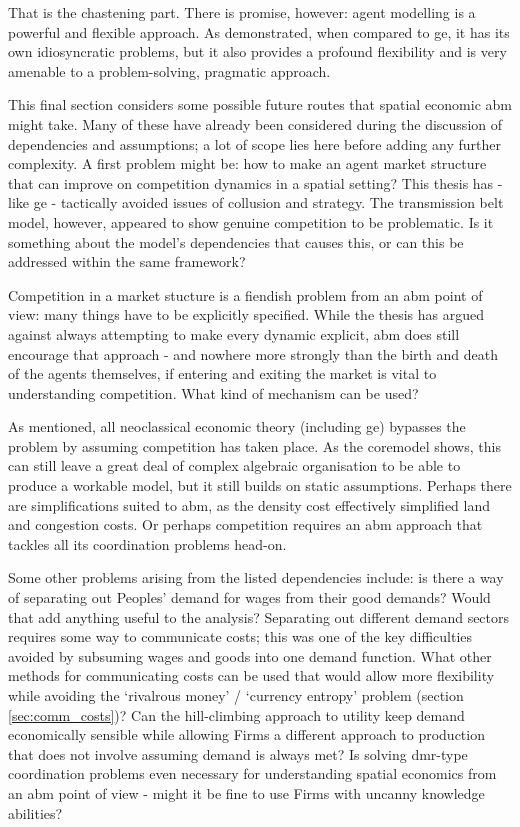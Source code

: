 That is the chastening part. There is promise, however: agent modelling is a powerful and flexible approach. As demonstrated, when compared to \gls{ge}, it has its own idiosyncratic problems, but it also provides a profound flexibility and is very amenable to a problem-solving, pragmatic approach.

This final section considers some possible future routes that spatial economic \gls{abm} might take. Many of these have already been considered during the discussion of dependencies and assumptions; a lot of scope lies here before adding any further complexity. A first problem might be: how to make an agent market structure that can improve on competition dynamics in a spatial setting? This thesis has - like \gls{ge} - tactically avoided issues of collusion and strategy. The transmission belt model, however, appeared to show genuine competition to be problematic. Is it something about the model's dependencies that causes this, or can this be addressed within the same framework? 

Competition in a market stucture is a fiendish problem from an \gls{abm} point of view: many things have to be explicitly specified. While the thesis has argued against always attempting to make every dynamic explicit, \gls{abm} does still encourage that approach - and nowhere more strongly than the birth and death of the agents themselves, if entering and exiting the market is vital to understanding competition. What kind of mechanism can be used?

As mentioned, all neoclassical economic theory (including \gls{ge}) bypasses the problem by assuming competition has taken place. As the \gls{coremodel} shows, this can still leave a great deal of complex algebraic organisation to be able to produce a workable model, but it still builds on static assumptions. Perhaps there are simplifications suited to \gls{abm}, as the density cost effectively simplified land and congestion costs. Or perhaps competition requires an \gls{abm} approach that tackles all its coordination problems head-on.

Some other problems arising from the listed dependencies include: is there a way of separating out Peoples' demand for wages from their good demands? Would that add anything useful to the analysis? Separating out different demand sectors requires some way to communicate costs; this was one of the key difficulties avoided by subsuming wages and goods into one demand function. What other methods for communicating costs can be used that would allow more flexibility while avoiding the `rivalrous money' / `currency entropy' problem (section \ref{sec:comm_costs})? Can the hill-climbing approach to utility keep demand economically sensible while allowing Firms a different approach to production that does not involve assuming demand is always met? Is solving \gls{dmr}-type coordination problems even necessary for understanding spatial economics from an \gls{abm} point of view - might it be fine to use Firms with uncanny knowledge abilities?

